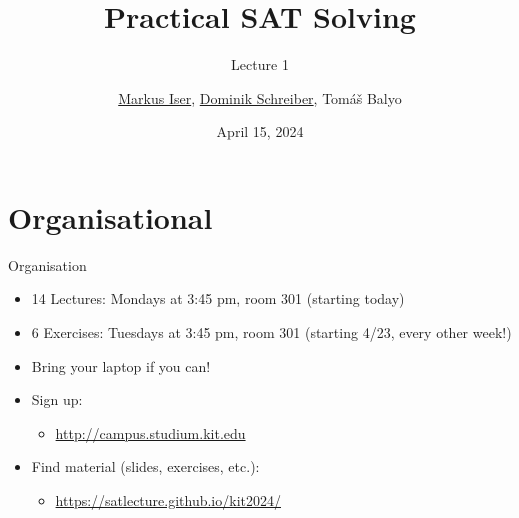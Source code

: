 \documentclass[t]{sdqbeamer}
\title[SAT Solving]{Practical SAT Solving}
\subtitle{Lecture 1}
\author{\underline{Markus Iser}, \underline{Dominik Schreiber}, Tom\'a\v{s} Balyo}
\date{April 15, 2024}
\begin{document}
\begin{frame}
	\thispagestyle{empty}
	\titlepage{}
\end{frame}

\section{Organisational}
\begin{frame}{Organisation}
	\begin{itemize}\setlength{\itemsep}{1em}
		\item 14 Lectures: Mondays at 3:45 pm, room 301 (starting today)
		\item 6 Exercises: Tuesdays at 3:45 pm, room 301 (starting 4/23, every other week!)
		\item Bring your laptop if you can!
		\item Sign up:
		\begin{itemize}
			\item \url{http://campus.studium.kit.edu}
		\end{itemize}
		\item Find material (slides, exercises, etc.):
		\begin{itemize}
			\item \url{https://satlecture.github.io/kit2024/}
		\end{itemize}
	\end{itemize}
\end{frame}
\end{document}

